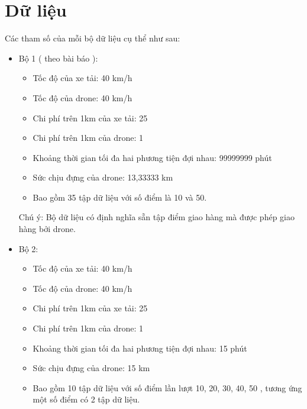 \documentclass[a4paper,12pt]{report}
\begin{document}
\section{Dữ liệu}
Các tham số của mỗi bộ dữ liệu cụ thể như sau:
\begin{itemize}
\item Bộ 1 ( theo bài báo \cite{main}): 
\begin{itemize}
\item Tốc độ của xe tải: 40 km/h
\item Tốc độ của drone: 40 km/h
\item Chi phí trên 1km của xe tải: 25
\item Chi phí trên 1km của drone: 1
\item Khoảng thời gian tối đa hai phương tiện đợi nhau: 99999999 phút
\item Sức chịu đựng của drone: 13,33333 km
\item Bao gồm 35 tập dữ liệu với số điểm là 10 và 50.
\end{itemize}
Chú ý: Bộ dữ liệu có định nghĩa sẵn tập điểm giao hàng mà được phép giao hàng bởi drone.
\item Bộ 2: 
\begin{itemize}
\item Tốc độ của xe tải: 40 km/h
\item Tốc độ của drone: 40 km/h
\item Chi phí trên 1km của xe tải: 25
\item Chi phí trên 1km của drone: 1
\item Khoảng thời gian tối đa hai phương tiện đợi nhau: 15 phút
\item Sức chịu đựng của drone: 15 km
\item Bao gồm 10 tập dữ liệu với số điểm lần lượt 10, 20, 30, 40, 50 , tương ứng một số điểm có 2 tập dữ liệu. 
\end{itemize}
\end{itemize}
\end{document}
